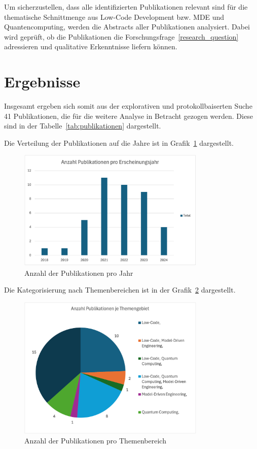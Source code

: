 Um sicherzustellen, dass alle identifizierten Publikationen relevant sind für die thematische Schnittmenge aus Low-Code Development bzw. 
MDE und Quantencomputing, werden die Abstracts aller Publikationen analysiert. Dabei wird geprüft, ob die Publikationen die 
Forschungsfrage~\ref{research_question} adressieren und qualitative Erkenntnisse liefern können. 

\section{Ergebnisse}
Insgesamt ergeben sich somit aus der explorativen und protokollbaiserten Suche 41 Publikationen, die für die weitere Analyse 
in Betracht gezogen werden. Diese sind in der Tabelle~\ref{tab:publikationen} dargestellt. 

Die Verteilung der Publikationen auf die Jahre ist in Grafik~\ref{fig:publications_per_year} dargestellt.

\begin{figure}[h!]
    \centering
    \includegraphics[width=0.8\textwidth]{graphics/anzahl_pubs_jahr.png}
    \caption{Anzahl der Publikationen pro Jahr}
    \label{fig:publications_per_year}
\end{figure}

Die Kategorisierung nach Themenbereichen ist in der Grafik~\ref{fig:publications_per_topic} dargestellt.

\begin{figure}[h!]
    \centering
    \includegraphics[width=0.8\textwidth]{graphics/anzahl_themen_pubs.png}
    \caption{Anzahl der Publikationen pro Themenbereich}
    \label{fig:publications_per_topic}
\end{figure}

